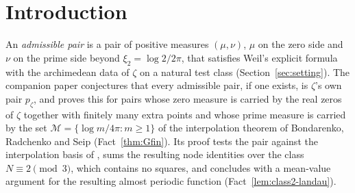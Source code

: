 \documentclass[11pt]{amsart}
\newcommand{\xin}[1]{\xi_{#1}}
\newcommand{\BRS}{\mathcal M}
\newcommand{\pz}{p_\zeta}
\theoremstyle{definition}
\theoremstyle{remark}
\numberwithin{equation}{section}
\begin{document}
\setcounter{tocdepth}{1}
\tableofcontents


\section{Introduction}\label{sec:intro}

An \emph{admissible pair} is a pair of positive measures $(\mu,\nu)$, $\mu$ on the zero side and $\nu$ on the prime side
beyond $\xin2=\log2/2\pi$, that satisfies Weil's explicit formula with the archimedean data of $\zeta$ on a natural test class
(Section~\ref{sec:setting}). The companion paper \cite{PaperI} conjectures that every admissible pair, if one exists, is $\zeta$'s own
pair $\pz$, and proves this for pairs whose zero measure is carried by the real zeros of $\zeta$ together with finitely many extra
points and whose prime measure is carried by the set $\BRS=\{\log m/4\pi:m\ge1\}$ of the interpolation theorem of Bondarenko,
Radchenko and Seip \cite{BRS} (Fact~\ref{thm:Gfin}). Its proof tests the pair against the interpolation basis of \cite{BRS}, sums
the resulting node identities over the class $N\equiv2\pmod3$, which contains no squares, and concludes with a mean-value argument
for the resulting almost periodic function (Fact~\ref{lem:class2-landau}).
\end{document}
